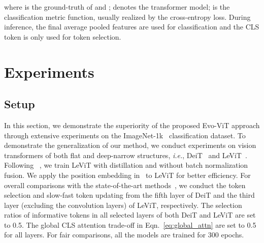 \documentclass[letterpaper]{article} \usepackage{aaai22}  \usepackage{times}  \usepackage{helvet}  \usepackage{courier}  \usepackage[hyphens]{url}  \usepackage{graphicx} \urlstyle{rm} \def\UrlFont{\rm}  \usepackage{natbib}  \usepackage{caption} \DeclareCaptionStyle{ruled}{labelfont=normalfont,labelsep=colon,strut=off} \frenchspacing  \setlength{\pdfpagewidth}{8.5in}  \setlength{\pdfpageheight}{11in}  \usepackage{algorithm}
\begin{document}
where  is the ground-truth of  and ;  denotes the transformer model;  is the classification metric function, usually realized by the cross-entropy loss.
During inference, the final average pooled features are used for classification and the CLS token is only used for token selection. 

%
 
\section{Experiments}
\label{sec:experiments}

\subsection{Setup}
In this section, we demonstrate the superiority of the proposed Evo-ViT approach through extensive experiments on the ImageNet-1k~\cite{imagenet} classification dataset. To demonstrate the generalization of our method, we conduct experiments on vision transformers of both flat and deep-narrow structures, \emph{i.e.}, DeiT~\cite{DeiT} and LeViT~\cite{LeViT}. Following ~\cite{LeViT}, we train LeViT with distillation and without batch normalization fusion.
We apply the position embedding in~\cite{PVT} to LeViT for better efficiency.
For overall comparisons with the state-of-the-art methods~\cite{DynamicViT,PatchSlimming,SViTE,IA-RED2}, we conduct the token selection and slow-fast token updating from the fifth layer of DeiT and 
the third layer (excluding the convolution layers) of LeViT, respectively. The selection ratios of informative tokens in all selected layers of both DeiT and LeViT are set to 0.5.
The global CLS attention trade-off  in Eqn.~\ref{eq:global_attn} are set to 0.5 for all layers.
For fair comparisons, all the models are trained for 300 epochs.
\end{document}
